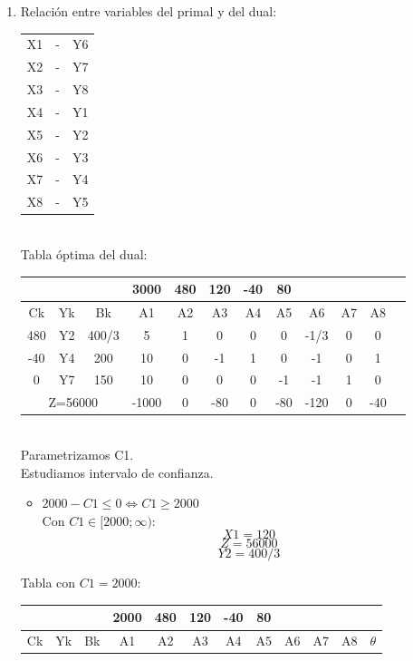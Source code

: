 \documentclass{article}
\begin{document}
\begin{enumerate}
	\item Relaci\'on entre variables del primal y del dual:\\
		\begin{tabular}{c c c}
			X1 & - & Y6 \\
			X2 & - & Y7 \\
			X3 & - & Y8 \\
			X4 & - & Y1 \\
			X5 & - & Y2 \\
			X6 & - & Y3 \\
			X7 & - & Y4 \\
			X8 & - & Y5 \\
		\end{tabular}
		\\
		Tabla \'optima del dual:\\
		\begin{tabular}{|c  c  c | c  c  c  c  c  c  c  c | c |}
			\hline
			 \multicolumn{3}{|c|}{} & 3000 & 480 & 120 & -40 & 80 & & &\\ \hline
			 Ck & Yk & Bk & A1 & A2 & A3 & A4 & A5 & A6 & A7 & A8\\ \hline 
			 480 & Y2 & 400/3 & 5 & 1 & 0 & 0 & 0 & -1/3 & 0 & 0\\
			 -40 & Y4 & 200 & 10 & 0 & -1 & 1 & 0 & -1 & 0 & 1\\
			 0 & Y7 & 150 & 10 & 0 & 0 & 0 & -1 & -1 & 1 & 0\\ \hline
			 \multicolumn{3}{|c|}{Z=56000} & -1000 & 0 & -80 & 0 & -80 & -120 & 0 & -40\\ \hline
		\end{tabular}
		\medskip\\
		Parametrizamos C1.\\
		Estudiamos intervalo de confianza.
		\begin{itemize}
				\item $2000 - C1 \leq 0 \iff C1 \geq 2000$\\
					Con $C1 \in [2000; \infty)$:\\
					$$X1 = 120$$
					$$Z = 56000$$
					$$Y2 = 400/3$$
		\end{itemize}
		Tabla con $C1 = 2000$:\\
			\begin{tabular}{|c  c  c | c  c  c  c  c  c  c  c | c |}
			\hline
			 \multicolumn{3}{|c|}{} & 2000 & 480 & 120 & -40 & 80 & & & &\\ \hline
			 Ck & Yk & Bk & A1 & A2 & A3 & A4 & A5 & A6 & A7 & A8 & $\theta$\\ \hline 

\end{tabular}
\end{enumerate}
\end{document}
